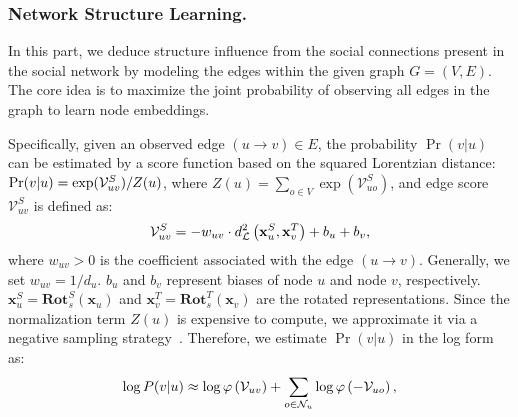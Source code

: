 
\subsubsection{Network Structure Learning.}

In this part, we deduce structure influence from the social connections present in the social network by modeling the edges within the given graph $G=(V, E)$. 
The core idea is to maximize the joint probability of observing all edges in the graph to learn node embeddings.

Specifically, given an observed edge $(u \rightarrow v) \in E$, the probability $\Pr(v|u)$ can be estimated by a score function based on the squared Lorentzian distance:
$\small \Pr(v|u) = \exp(\mathcal{V}^{S}_{uv})  /  Z(u) $,
where $Z(u) = \sum_{ o \in V } \exp(\mathcal{V}^{S}_{uo})$, and
edge score $\mathcal{V}^{S}_{uv} $ is defined as:
\begin{equation} 
\small \mathcal{V}^{S}_{uv} = - w_{uv} \cdot d^2_{\mathcal{L}}\left(\mathbf{x}^S_u, \mathbf{x}^T_v\right) + b_u + b_v,
\label{eq:relation-score}
\end{equation}
where $ w_{uv} > 0 $ is the coefficient associated with the edge $(u \rightarrow v)$.
Generally, we set $w_{uv} = 1/d_{u}$.
$b_u$ and $b_v$ represent biases of node $u$ and node $v$, respectively.
$\mathbf{x}^S_u = \mathbf{Rot}_{s}^S(\mathbf{x}_u)$ and $\mathbf{x}^T_v = \mathbf{Rot}_{s}^T(\mathbf{x}_v)$ are the rotated representations. 
Since the normalization term $Z(u)$ is expensive to compute, we approximate it via a negative sampling strategy~\cite{mikolov2013neg-sampling}.
Therefore, we estimate $\Pr(v|u)$ in the log form as:
\begin{equation}
\small \log P(v|u) \approx \log \varphi \left(\mathcal{V}_{uv} \right) + \sum_{o \in \mathcal{N}_u} \log \varphi \left( - \mathcal{V}_{uo}\right),
\label{eq:log_p_u_v}
\end{equation}
